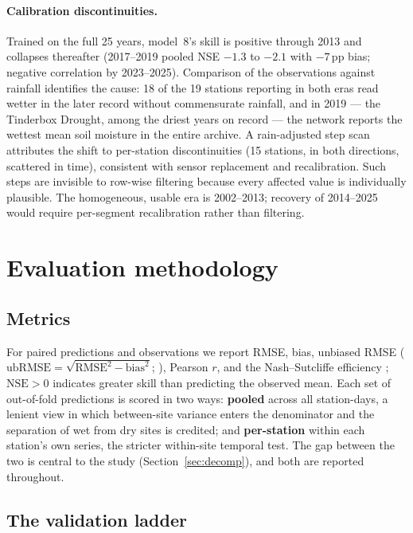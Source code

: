 \documentclass[11pt,a4paper]{article}
\newcommand{\nse}{\mathrm{NSE}}
\newcommand{\ubrmse}{\mathrm{ubRMSE}}
\begin{document}
\paragraph{Calibration discontinuities.} Trained on the full 25 years,
model~8's skill is positive through 2013 and collapses thereafter (2017--2019
pooled NSE $-1.3$ to $-2.1$ with $-7$\,pp bias; negative correlation by
2023--2025). Comparison of the observations against rainfall identifies the
cause: 18 of the 19 stations reporting in both eras read wetter in the later
record without commensurate rainfall, and in 2019 --- the Tinderbox Drought,
among the driest years on record --- the network reports the wettest mean soil
moisture in the entire archive. A rain-adjusted step scan attributes the shift
to per-station discontinuities (15 stations, in both directions, scattered in
time), consistent with sensor replacement and recalibration. Such steps are
invisible to row-wise filtering because every affected value is individually
plausible. The homogeneous, usable era is 2002--2013; recovery of 2014--2025
would require per-segment recalibration rather than filtering.

\section{Evaluation methodology}\label{sec:eval}

\subsection{Metrics}\label{sec:metrics}

For paired predictions and observations we report RMSE, bias, unbiased RMSE
($\ubrmse = \sqrt{\mathrm{RMSE}^2 - \mathrm{bias}^2}$;
\citealp{entekhabi2010metrics}), Pearson $r$, and the Nash--Sutcliffe
efficiency \citep[NSE;][]{nash1970}; $\nse > 0$ indicates greater skill than
predicting the observed mean. Each set of out-of-fold predictions is scored in
two ways: \textbf{pooled} across all station-days, a lenient view in which
between-site variance enters the denominator and the separation of wet from
dry sites is credited; and \textbf{per-station} within each station's own
series, the stricter within-site temporal test. The gap between the two is
central to the study (Section~\ref{sec:decomp}), and both are reported
throughout.

\subsection{The validation ladder}\label{sec:ladder}
\end{document}

